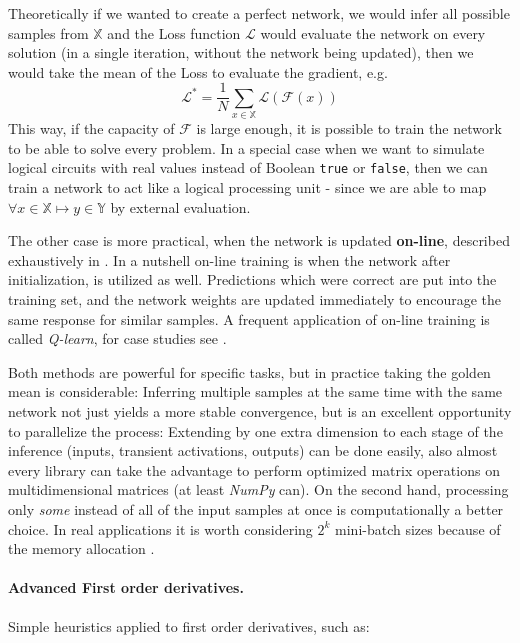 Theoretically if we wanted to create a perfect network, we would infer all possible samples from $\mathbb{X}$ and the Loss function 
$\mathcal{L}$ would evaluate the network on every solution (in a single iteration, without the network being updated), 
then we would take the mean of the Loss to evaluate the gradient, e.g. 
$$\mathcal{L}^*=\frac{1}{N}\sum_{x \in \mathbb{X}}\mathcal{L}(\mathcal{F}(x))$$
This way, if the capacity of $\mathcal{F}$ is large enough, it is possible to train the network to be able to solve every problem.
In a special case when we want to simulate logical circuits with real values instead of Boolean \texttt{true} or \texttt{false},
then we can train a network to act like a logical processing unit - since we are able to map $\forall x \in \mathbb{X} \mapsto y \in \mathbb{Y}$ by 
external evaluation.

The other case is more practical, when the network is updated \textbf{on-line}, described exhaustively in \cite{onlinelearn}. 
In a nutshell on-line training is when the network after initialization, is utilized as well.
Predictions which were correct are put into the training set, and the network weights are updated immediately 
to encourage the same response for similar samples.
A frequent application of on-line training is called \emph{Q-learn}, for case studies see \cite{qlearn-case}.

Both methods are powerful for specific tasks, but in practice taking the golden mean is considerable:
Inferring multiple samples at the same time with the same network not just yields a more stable convergence, 
but is an excellent opportunity to parallelize the process:
Extending by one extra dimension to each stage of the inference (inputs, transient activations, outputs) can be done easily,
also almost every library can take the advantage to perform optimized matrix operations on multidimensional matrices (at least \emph{NumPy} can).
On the second hand, processing only \emph{some} instead of all of the input samples at once is computationally a better choice.
In real applications it is worth considering $2^k$ mini-batch sizes because of the memory allocation \cite{stanfordlectures}.

\paragraph{Advanced First order derivatives.} 
Simple heuristics applied to first order derivatives, such as:



